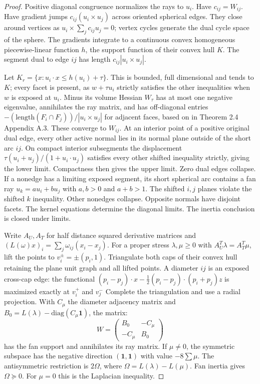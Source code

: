\documentclass[10pt,reqno]{amsart}
\begin{document}
\begin{proof}
    Positive diagonal congruence normalizes the rays to $u_i$. Have $c_{ij} = W_{ij}$. Have gradient jumps $c_{ij}(u_i \times u_j)$ across oriented spherical edges. They close around vertices as $u_i \times \sum_j c_{ij}u_j = 0$; vertex cycles generate the dual cycle space of the sphere. The gradients integrate to a continuous convex homogeneous piecewise-linear function $h$, the support function of their convex hull $K$. The segment dual to edge $ij$ has length $c_{ij} |u_i \times u_j|$.

    Let $K_r = \{x: u_i \cdot x \le h(u_i) + \tau\}$. This is bounded, full dimensional and tends to $K$; every facet is present, as $w + \tau u_i$ strictly satisfies the other inequalities when $w$ is exposed at $u_i$. Minus its volume Hessian $W_\tau$ has at most one negative eigenvalue, annihilates the ray matrix, and has off-diagonal entries $-(\text{length}(F_i \cap F_j)) / |u_i \times u_j|$ for adjacent faces, based on \cite{5} in Theorem 2.4 Appendix A.3. These converge to $W_{ij}$. At an interior point of a positive original dual edge, every other active normal lies in its normal plane outside of the short arc $ij$. On compact interior subsegments the displacement $\tau (u_i + u_j) / (1 + u_i \cdot u_j)$ satisfies every other shifted inequality strictly, giving the lower limit. Compactness then gives the upper limit. Zero dual edges collapse. If a nonedge has a limiting exposed segment, its short spherical arc contains a fan ray $u_k = au_i + bu_j$ with $a, b > 0$ and $a + b > 1$. The shifted $i, j$ planes violate the shifted $k$ inequality. Other nonedges collapse. Opposite normals have disjoint facets. The kernel equations determine the diagonal limits. The inertia conclusion is closed under limits.

    Write $A_U, A_T$ for half distance squared derivative matrices and $(L(\omega)x)_i = \sum_j \omega_{ij} (x_i - x_j)$. For a proper stress $\lambda, \mu \ge 0$ with $A_U^T \lambda = A_T^T \mu$, lift the points to $v_i^\pm = \pm (p_i, 1)$. Triangulate both caps of their convex hull retaining the plane unit graph and all lifted points. A diameter $ij$ is an exposed cross-cap edge: the functional $(p_i - p_j) \cdot x - \frac{1}{2} (p_i - p_j) \cdot (p_i + p_j)z$ is maximized exactly at $v_i^+$ and $v_j^-$ Complete the triangulation and use a radial projection. With $C_\mu$ the diameter adjacency matrix and $B_0 = L(\lambda) - \text{diag} (C_\mu \textbf{1})$, the matrix:
    \begin{equation}
        W = \begin{pmatrix} B_0  & -C_\mu \\ -C_\mu & B_0 \end{pmatrix}
    \end{equation}
    has the fan support and annihilates its ray matrix. If $\mu \ne 0$, the symmetric subspace has the negative direction $(\textbf{1}, \textbf{1})$ with value $-8 \sum \mu$. The antisymmetric restriction is $2\Omega$, where $\Omega = L ( \lambda ) - L ( \mu )$. Fan inertia gives $\Omega \succeq 0$. For $\mu = 0$ this is the Laplacian inequality.


\end{proof}
\end{document}
